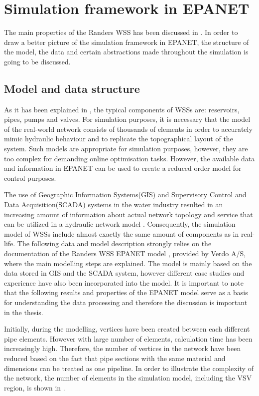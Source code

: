 \section{Simulation framework in EPANET}
\label{simulation_framework_in_EPANET}

The main properties of the Randers WSS has been discussed in . In order to draw a better picture of the simulation framework in EPANET, the structure of the model, the data and certain abstractions made throughout the simulation is going to be discussed. 

\subsection{Model and data structure}
\label{model_data_and_structure}

As it has been explained in , the typical components of WSSs are: reservoirs, pipes, pumps and valves. For simulation purposes, it is necessary that the model of the real-world network consists of thousands of elements in order to accurately mimic hydraulic behaviour and to replicate the topographical layout of the system. Such models are appropriate for simulation purposes, however, they are too complex for demanding online optimisation tasks. However, the available data and information in EPANET can be used to create a reduced order model for control purposes. 

The use of Geographic Information Systems(GIS) and Supervisory Control and Data Acquisition(SCADA) systems in the water industry resulted in an increasing amount of information about actual network topology and service that can be utilized in a hydraulic network model \cite{johnson2016geographic}. Consequently, the simulation model of WSSs include almost exactly the same amount of components as in real-life. The following data and model description strongly relies on the documentation of the Randers WSS EPANET model \cite{verdo_doc}, provided by Verdo A/S, where the main modelling steps are explained. The model is mainly based on the data stored in GIS and the SCADA system, however different case studies and experience have also been incorporated into the model. It is important to note that the following results and properties of the EPANET model serve as a basis for understanding the data processing and therefore the discussion is important in the thesis.  

Initially, during the modelling, vertices have been created between each different pipe elements. However with large number of elements, calculation time has been increasingly high. Therefore, the number of vertices in the network have been reduced based on the fact that pipe sections with the same material and dimensions can be treated as one pipeline. In order to illustrate the complexity of the network, the number of elements in the simulation model, including the VSV region, is shown in .

